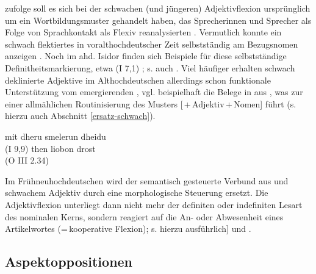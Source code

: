 \textcite[361--364]{Braunmuller2008} zufolge soll es sich bei der schwachen (und jüngeren) Adjektivflexion   ursprünglich um ein Wortbildungsmuster gehandelt haben, das Sprecherinnen und Sprecher als Folge von Sprachkontakt als Flexiv reanalysierten  \parencite[zu alternativen Entstehungsszenarien s.][13--26]{Kovari1984}. Vermutlich konnte ein schwach flektiertes   in voralthochdeutscher Zeit selbstständig  am Bezugsnomen anzeigen 
\parencites()()[69]{Demske2001}[364]{Braunmuller2008}. Noch im ahd. Isidor finden sich Beispiele für diese selbstständige Definitheitsmarkierung,  etwa   (I 7,1) \parencite[226]{Braune2004}; s. auch \textcite[69--70]{Demske2001}. 
Viel häufiger erhalten schwach deklinierte Adjektive   im Althochdeutschen allerdings schon funktionale Unterstützung vom emergierenden , vgl. beispielhaft die Belege in  aus \textcite[24,28]{Schrodt2004}, was zur einer allmählichen Routinisierung des Musters [\,+\,Adjektiv\,+\,Nomen] führt (s. hierzu auch Abschnitt \ref{ersatz-schwach}).

\begin{exe}
	\ex \label{ex:art-adj}   
	\begin{xlist}
		\ex \label{ex:art-adj1} mit dheru smelerun dheidu \\    (I 9,9) 
		\ex \label{ex:art-adj2} then liobon drost  \\  (O III 2.34)
		\end{xlist}
\end{exe}
 
Im Frühneuhochdeutschen wird der semantisch gesteuerte Verbund aus  und schwachem Adjektiv   durch eine morphologische Steuerung ersetzt. Die Adjektivflexion   unterliegt dann nicht mehr der definiten  oder indefiniten Lesart  des nominalen Kerns, sondern reagiert auf die An- oder Abwesenheit eines Artikelwortes  (=\,kooperative Flexion); s. hierzu ausführlich]\textcite{Demske2001} und \textcite{Szczepaniak2011a}. 

\subsection{Aspektoppositionen} \label{sec:aspektoppo}

